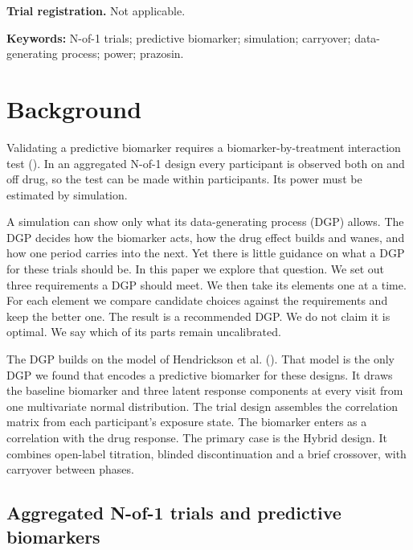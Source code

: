 \documentclass[
  11pt,
]{article}
\begin{document}
\textbf{Trial registration.} Not applicable.

\textbf{Keywords:} N-of-1 trials; predictive biomarker; simulation;
carryover; data-generating process; power; prazosin.

\section{Background}\label{background}

Validating a predictive biomarker requires a biomarker-by-treatment
interaction test (). In an aggregated N-of-1 design every
participant is observed both on and off drug, so the test can be made
within participants. Its power must be estimated by simulation.

A simulation can show only what its data-generating process (DGP)
allows. The DGP decides how the biomarker acts, how the drug effect
builds and wanes, and how one period carries into the next. Yet there
is little guidance on what a DGP for these trials should be. In this
paper we explore that question. We set out three requirements a DGP
should meet. We then take its elements one at a time. For each element
we compare candidate choices against the requirements and keep the
better one. The result is a recommended DGP. We do not claim it is
optimal. We say which of its parts remain uncalibrated.

The DGP builds on the model of Hendrickson et al. ().
That model is the only DGP we found that encodes a predictive biomarker for
these designs. It draws the baseline biomarker and three latent
response components at every visit from one multivariate normal
distribution. The trial
design assembles the correlation matrix from each participant's
exposure state. The biomarker enters as a correlation with the drug
response. The primary case is the Hybrid design. It combines
open-label titration, blinded discontinuation and a brief crossover,
with carryover between phases.

\subsection{Aggregated N-of-1 trials and predictive biomarkers}\label{aggregated-n-of-1-trials-and-predictive-biomarkers}
\end{document}
